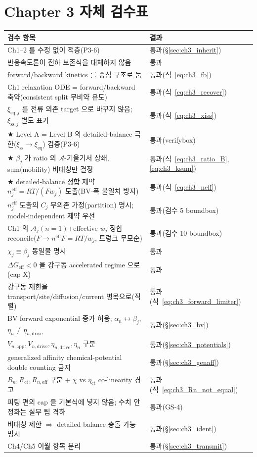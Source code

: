 \documentclass[11pt,a4paper]{article}
\newcommand{\eff}{\mathrm{eff}}
\newcommand{\eq}{\mathrm{eq}}
\newcommand{\app}{\mathrm{app}}
\newcommand{\drive}{\mathrm{drive}}
\newcommand{\ct}{\mathrm{ct}}
\newcommand{\sstat}{\mathrm{ss}}
\begin{document}
\section{Chapter 3 자체 검수표}\label{sec:ch3_selfcheck}
{\small
\begin{longtable}{p{} p{}}
\toprule 검수 항목 & 결과 \\ \midrule \endhead
Ch1--2 를 수정 없이 적층(P3-6) & 통과(\S\ref{sec:ch3_inherit}) \\
반응속도론이 전하 보존식을 대체하지 않음 & 통과 \\
forward/backward kinetics 를 중심 구조로 둠 & 통과(식~\eqref{eq:ch3_fb}) \\
Ch1 relaxation ODE = forward/backward 축약(consistent split 무비약 유도) & 통과(식~\eqref{eq:ch3_recover}) \\
$\xi_{\eq,j}$ 를 전류 의존 target 으로 바꾸지 않음; $\xi_{\sstat,j}$ 별도 표기 & 통과(식~\eqref{eq:ch3_xiss}) \\
★ Level A = Level B 의 detailed-balance 극한($\xi_{\sstat}\to\xi_{\eq}$) 검증(P3-6) & 통과(verifybox) \\
★ $\beta_j$ 가 ratio 의 $\mathcal A$-기울기서 상쇄, sum(mobility) 비대칭만 결정 & 통과(식~\eqref{eq:ch3_ratio_B},\eqref{eq:ch3_ksum}) \\
★ detailed-balance 정합 제약 $n_j^{\eff}=RT/(Fw_j)$ 도출(BV-폭 불일치 방지) & 통과(식~\eqref{eq:ch3_neff}) \\
$n_j^{\eff}$ 도출의 $C_j$ 무의존 가정(partition) 명시; model-independent 제약 우선 & 통과(검수 5 boundbox) \\
Ch1 의 $\mathcal A_j(n{=}1)$+effective $w_j$ 정합 reconcile($F\to n^{\eff}F=RT/w_j$, 트렁크 무모순) & 통과(검수 10 boundbox) \\
$\chi_j\equiv\beta_j$ 동일물 명시 & 통과 \\
$\Delta G_{\eff}<0$ 을 강구동 accelerated regime 으로(cap X) & 통과 \\
강구동 제한을 transport/site/diffusion/current 병목으로(직렬) & 통과(식~\eqref{eq:ch3_forward_limiter}) \\
BV forward exponential 증가 허용; $\alpha_n\leftrightarrow\beta_j$, $\eta_n\ne\eta_{n,\drive}$ & 통과(\S\ref{sec:ch3_bv}) \\
$V_{n,\app},V_{n,\drive},\eta_{n,\drive},\eta_n$ 구분 & 통과(\S\ref{sec:ch3_potentials}) \\
generalized affinity chemical-potential double counting 금지 & 통과(\S\ref{sec:ch3_genaff}) \\
$R_n,R_{\ct},R_{n,\eff}$ 구분 + $\chi$ vs $\eta_{\ct}$ co-linearity 경고 & 통과(식~\eqref{eq:ch3_Rn_not_equal}) \\
피팅 편의 cap 을 기본식에 넣지 않음; 수치 안정화는 실무 팁 격하 & 통과(GS-4) \\
비대칭 제한 $\Rightarrow$ detailed balance 충돌 가능 명시 & 통과(\S\ref{sec:ch3_ident}) \\
Ch4/Ch5 이월 항목 분리 & 통과(\S\ref{sec:ch3_transmit}) \\
\bottomrule
\end{longtable}
}
\end{document}
